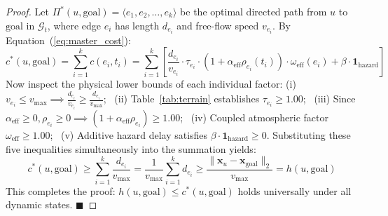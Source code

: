 \documentclass[10pt,a4paper]{article}
\begin{document}
\begin{proof}
Let $\Pi^*(u, \text{goal}) = \langle e_1, e_2, \dots, e_k \rangle$ be the optimal directed path from $u$ to $\text{goal}$ in $\mathcal{G}_t$, where edge $e_i$ has length $d_{e_i}$ and free-flow speed $v_{e_i}$. By Equation~(\ref{eq:master_cost}):
$$c^*(u, \text{goal}) = \sum_{i=1}^k c(e_i, t_i) = \sum_{i=1}^k \left[ \frac{d_{e_i}}{v_{e_i}} \cdot \tau_{e_i} \cdot (1 + \alpha_{\text{eff}}\rho_{e_i}(t_i)) \cdot \omega_{\text{eff}}(e_i) + \beta \cdot \mathbf{1}_{\text{hazard}} \right]$$
Now inspect the physical lower bounds of each individual factor:
(i) $v_{e_i} \le v_{\max} \implies \frac{d_{e_i}}{v_{e_i}} \ge \frac{d_{e_i}}{v_{\max}}$; \ 
(ii) Table~\ref{tab:terrain} establishes $\tau_{e_i} \ge 1.00$; \ 
(iii) Since $\alpha_{\text{eff}} \ge 0, \rho_{e_i} \ge 0 \implies (1 + \alpha_{\text{eff}}\rho_{e_i}) \ge 1.00$; \ 
(iv) Coupled atmospheric factor $\omega_{\text{eff}} \ge 1.00$; \ 
(v) Additive hazard delay satisfies $\beta \cdot \mathbf{1}_{\text{hazard}} \ge 0$.
Substituting these five inequalities simultaneously into the summation yields:
$$c^*(u, \text{goal}) \ge \sum_{i=1}^k \frac{d_{e_i}}{v_{\max}} = \frac{1}{v_{\max}} \sum_{i=1}^k d_{e_i} \ge \frac{\|\mathbf{x}_u - \mathbf{x}_{\text{goal}}\|_2}{v_{\max}} = h(u, \text{goal})$$
This completes the proof: $h(u, \text{goal}) \le c^*(u, \text{goal})$ holds universally under all dynamic states. \hfill $\blacksquare$
\end{proof}
\end{document}
